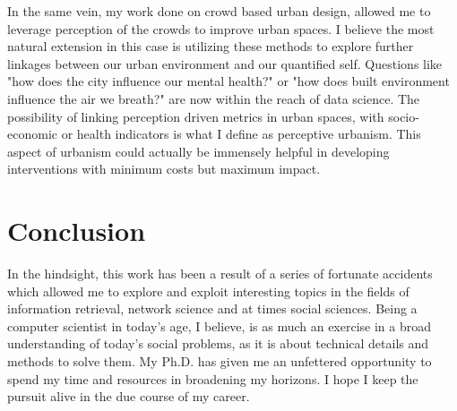 In the same vein, my work done on crowd based urban design, allowed me to leverage perception of the crowds to improve urban spaces. I believe the most natural extension in this case is utilizing these methods to explore further linkages between our urban environment and our quantified self. Questions like "how does the city influence our mental health?" or "how does built environment influence the air we breath?" are now within the reach of data science. The possibility of linking perception driven metrics in urban spaces, with socio-economic or health indicators is what I define as perceptive urbanism. 
This aspect of urbanism could actually be immensely helpful in developing interventions with minimum costs but maximum impact. 

\section{Conclusion}

In the hindsight, this work has been a result of a series of fortunate accidents which allowed me to explore and exploit interesting topics in the fields of information retrieval, network science and at times social sciences. Being a computer scientist in today's age, I believe, is as much an exercise in a broad understanding of today's social problems, as it is about technical details and methods to solve them. My Ph.D. has given me an unfettered opportunity to spend my time and resources in broadening my horizons. I hope I keep the pursuit alive in the due course of my career. 